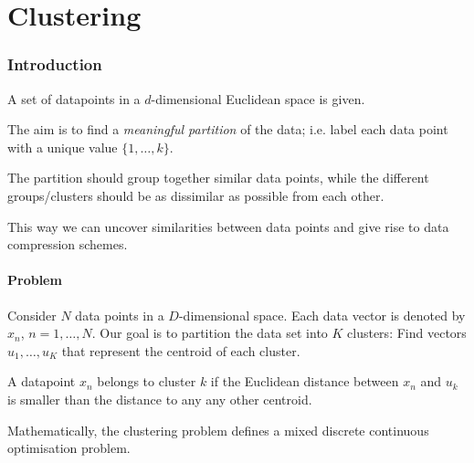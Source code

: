 \newpage
\part{Clustering}

\section{Introduction}
A set of datapoints in a $d$-dimensional Euclidean space is given.
\begin{description}
    \item[Aim] The aim is to find a \emph{meaningful partition} of the data; i.e. label each data point with a unique value $\{1,\ldots, k\}$.
    \item[Objective] The partition should group together similar data points, while the different groups/clusters should be as dissimilar as possible from each other.
    \item This way we can uncover similarities between data points and give rise to data compression schemes.
\end{description}


\subsection{Problem}
Consider $N$ data points in a $D$-dimensional space. Each data vector is denoted by $x_n$, $n=1,\ldots,N$. Our goal is to partition the data set into $K$ clusters: Find vectors $u_1, \ldots, u_K$ that represent the centroid of each cluster.

A datapoint $x_n$ belongs to cluster $k$ if the Euclidean distance between $x_n$ and $u_k$ is smaller than the distance to any any other centroid.

Mathematically, the clustering problem defines a mixed discrete continuous optimisation problem. 

